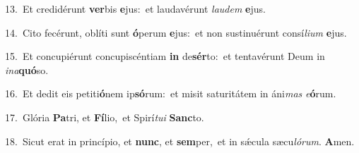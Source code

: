 {\numbfont\textcolor{\numbcolor}{13.}}~Et credidérunt \textbf{ver}\-bis \textbf{e}\-jus:~\star et laudavérunt \textit{lau}\-\textit{dem} \textbf{e}\-jus.\par
{\numbfont\textcolor{\numbcolor}{14.}}~Cito fecérunt, oblíti sunt \textbf{ó}\-perum \textbf{e}\-jus:~\star et non sustinuérunt consí\-\textit{li}\-\textit{um} \textbf{e}\-jus.\par
{\numbfont\textcolor{\numbcolor}{15.}}~Et concupiérunt concupiscéntiam \textbf{in} de\-\textbf{sér}\-to:~\star et tentavérunt Deum in \textit{in}\-\textit{a}\textbf{quó}so.\par
{\numbfont\textcolor{\numbcolor}{16.}}~Et dedit eis petiti\-\textbf{ó}\-nem ip\-\textbf{só}\-rum:~\star et misit saturitátem in áni\textit{mas} \textit{e}\-\textbf{ó}rum.\par
{\numbfont\textcolor{\numbcolor}{17.}}~Glória \textbf{Pa}\-tri, et \textbf{Fí}\-lio,~\star et Spirí\-\textit{tu}\-\textit{i} \textbf{Sanc}\-to.\par
{\numbfont\textcolor{\numbcolor}{18.}}~Sicut erat in princípio, et \textbf{nunc}\-, et \textbf{sem}\-per,~\star et in sǽcula sæcu\-\textit{ló}\-\textit{rum}. \textbf{A}\-men.\par
